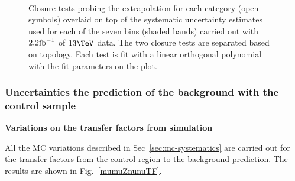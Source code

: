 \begin{figure}[h!]
  \begin{center}
    ~~
    \caption{Closure tests probing the \bdphi extrapolation for each
      \njet category (open symbols) overlaid on top of the systematic
      uncertainty estimates used for each of the seven \scalht bins
      (shaded bands) carried out with $2.2\ifb$ of $13\tev$
      data. The two closure tests are separated based on topology.
      Each test is fit with a linear orthogonal polynomial with the
      fit parameters on the plot.}
    \label{fig:closureBDPhi}
  \end{center} 
\end{figure}

\subsubsection{Uncertainties the prediction of the \znunu
background with the \mmj control sample}

{\bf Variations on the transfer factors from simulation}

All the MC variations described in Sec~\ref{sec:mc-systematics} are
carried out for the transfer factors from the \mmj control region to
the \znunu background prediction. The results are shown in
Fig.~\ref{mumuZnunuTF}.

